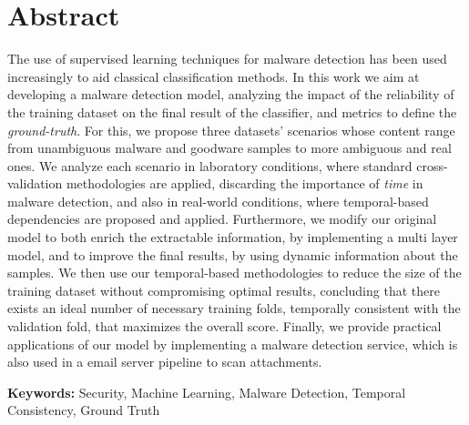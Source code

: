 
\section*{Abstract}


The use of supervised learning techniques for malware detection has been used increasingly to aid classical classification methods. 
In this work we aim at developing a malware detection model, analyzing the impact of the reliability of the training dataset on the final result of the classifier, and metrics to define the \emph{ground-truth}.
For this, we propose three datasets' scenarios whose content range from unambiguous malware and goodware samples to more ambiguous and real ones.
We analyze each scenario in laboratory conditions, where standard cross-validation methodologies are applied, discarding the importance of \emph{time} in malware detection, and also in real-world conditions, where temporal-based dependencies are proposed and applied.
Furthermore, we modify our original model to both enrich the extractable information, by implementing a multi layer model, and to improve the final results, by using dynamic information about the samples.
We then use our temporal-based methodologies to reduce the size of the training dataset without compromising optimal results, concluding that there exists an ideal number of necessary training folds, temporally consistent with the validation fold, that maximizes the overall score.
Finally, we provide practical applications of our model by implementing a malware detection service, which is also used in a email server pipeline to scan attachments.

\vfill

\textbf{\Large Keywords:} Security, Machine Learning, Malware Detection, Temporal Consistency, Ground Truth

